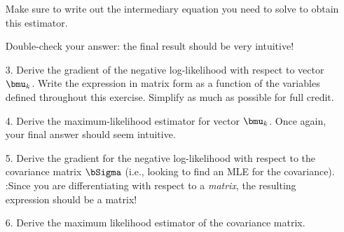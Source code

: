 \documentclass[submit]{harvardml}
\begin{document}
\begin{enumerate}
    Make sure to write out the intermediary equation you need
    to solve to obtain this estimator. 

    Double-check your answer: the final
    result should be very intuitive!

  \item[3.] Derive the gradient of the negative log-likelihood with respect to vector $\bmu_k$.
    Write the expression in matrix form as a function of the variables defined
    throughout this exercise. Simplify as much as possible for full credit.

  \item[4.] Derive the maximum-likelihood estimator for vector $\bmu_k$. Once
    again, your final answer should seem intuitive.

  \item[5.] Derive the gradient for the negative log-likelihood with respect to the
    covariance matrix $\bSigma$ (i.e., looking to find an MLE for the covariance). 
    :Since you are differentiating with respect to a \emph{matrix}, the resulting expression should be a matrix!
%
  \item[6.] Derive the maximum likelihood estimator of the covariance matrix.
\end{enumerate}




\end{document}
